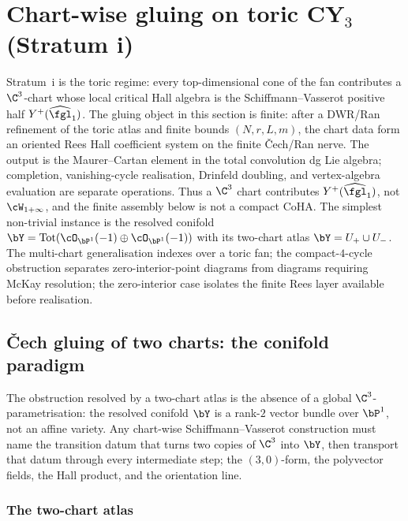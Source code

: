 \section{Chart-wise gluing on toric CY$_3$ (Stratum i)}
\label{sec:gluing:toric-cech}
\medskip

Stratum~i is the toric regime: every top-dimensional cone of the fan
contributes a $\C^3$-chart whose local critical Hall algebra is the
Schiffmann--Vasserot positive half $Y^+(\widehat{\fgl}_1)$. The gluing
object in this section is finite: after a DWR/Ran refinement of the
toric atlas and finite bounds $(N,r,L,m)$, the chart data form an
oriented Rees Hall coefficient system on the finite \v{C}ech/Ran nerve.
The output is the Maurer--Cartan element in the total convolution dg Lie
algebra; completion, vanishing-cycle realisation, Drinfeld doubling, and
vertex-algebra evaluation are separate operations. Thus a $\C^3$ chart
contributes $Y^+(\widehat{\fgl}_1)$, not $\cW_{1+\infty}$, and the
finite assembly below is not a compact CoHA. The simplest non-trivial
instance is the resolved conifold
\(
 \bY = \mathrm{Tot}(\cO_{\bP^1}(-1) \oplus \cO_{\bP^1}(-1))
\)
with its two-chart atlas $\bY = U_+ \cup U_-$. The multi-chart
generalisation indexes over a toric fan; the compact-$4$-cycle
obstruction separates zero-interior-point diagrams from diagrams
requiring McKay resolution; the zero-interior case isolates the finite
Rees layer available before realisation.

\subsection{\v{C}ech gluing of two charts: the conifold paradigm}
\label{sec:gluing-p2-conifold}

The obstruction resolved by a two-chart atlas is the absence of a global
$\C^3$-parametrisation: the resolved conifold $\bY$ is a rank-$2$ vector
bundle over $\bP^1$, not an affine variety. Any chart-wise
Schiffmann--Vasserot construction must name the transition datum that turns
two copies of $\C^3$ into $\bY$, then transport that datum through every
intermediate step; the $(3,0)$-form, the polyvector fields, the Hall
product, and the orientation line.

\subsubsection{The two-chart atlas}

